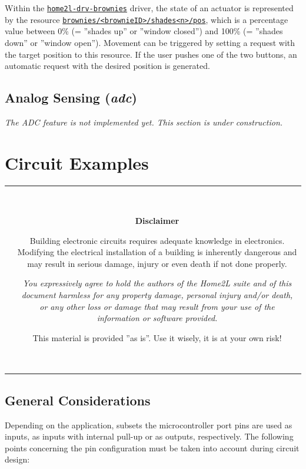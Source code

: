 \documentclass[12pt,english,parskip=half,headheight=19pt]{scrreprt}
\newcommand{\warnbox}[1]{
  \par
  \medskip
  \hfill
  \setlength\arrayrulewidth{1pt}
  \begin{tabular}[b]{c|c|}
    
    &
    \,\parbox{0.89\linewidth}{\setlength{\parskip}{0.5em}#1}\,
  \end{tabular}
  \medskip
  \par
}
\newcommand{\eshockdisclaimer}{
  \warnbox{\textbf{Disclaimer}

    Building electronic circuits requires adequate knowledge in electronics.
    Modifying the electrical installation of a building is inherently dangerous and may result in
    serious damage, injury or even death if not done properly.

    \textit{You expressively agree to hold the authors of the \textit{Home2L} suite and of this
    document harmless for any property damage, personal injury and/or death, or any other loss or
    damage that may result from your use of the information or software provided.}

    This material is provided ''as is''. Use it wisely, it is at your own risk!
  }
}
\newcommand{\idx}[1]{#1\index{#1}}
\newcommand{\refrc}[1]{\hyperref[rc:#1]{\texttt{#1}}}
\newcommand{\reftool}[1]{\hyperref[tool:#1]{\texttt{\idx{#1}}}}
\begin{document}
Within the \reftool{home2l-drv-brownies} driver, the state of an actuator is represented by the resource \refrc{brownies/<brownieID>/shades<n>/pos}, which is a percentage value between 0\% (= ''shades up'' or ''window closed'') and 100\% (= ''shades down'' or ''window open''). Movement can be triggered by setting a request with the target position to this resource. If the user pushes one of the two buttons, an automatic request with the desired position is generated.



\subsection{Analog Sensing (\textit{adc})}
\label{sec:brownies-features-adc}

\textit{The ADC feature is not implemented yet. This section is under construction.}





\section{Circuit Examples}
\label{sec:brownies-circuits}


\eshockdisclaimer



\subsection{General Considerations}

Depending on the application, subsets the microcontroller port pins are used as inputs, as inputs with internal pull-up or as outputs, respectively.
The following points concerning the pin configuration must be taken into account during circuit design:
\end{document}
